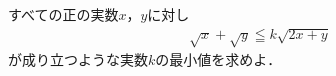 \documentclass[../../main.tex]{subfiles}
\begin{document}
すべての正の実数$x$，$y$に対し
\begin{align*}
  \sqrt{x}+\sqrt{y} \leqq k\sqrt{2x+y}
\end{align*}
が成り立つような実数$k$の最小値を求めよ．
\end{document}
